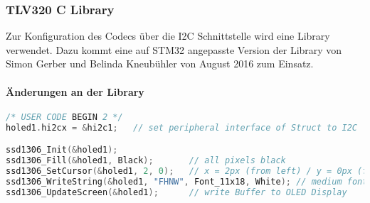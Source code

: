 \subsubsection{TLV320 C Library}
\label{sec:Library_tlv320}

Zur Konfiguration des Codecs über die I2C Schnittstelle wird eine Library verwendet.
Dazu kommt eine auf STM32 angepasste Version der Library von Simon Gerber und Belinda Kneubühler von August 2016 zum Einsatz.


\paragraph{Änderungen an der Library}


\begin{lstlisting}[language=c]
/* USER CODE BEGIN 2 */
holed1.hi2cx = &hi2c1;   // set peripheral interface of Struct to I2C

ssd1306_Init(&holed1);
ssd1306_Fill(&holed1, Black);       // all pixels black
ssd1306_SetCursor(&holed1, 2, 0);   // x = 2px (from left) / y = 0px (from top)
ssd1306_WriteString(&holed1, "FHNW", Font_11x18, White); // medium font
ssd1306_UpdateScreen(&holed1);      // write Buffer to OLED Display
\end{lstlisting}

